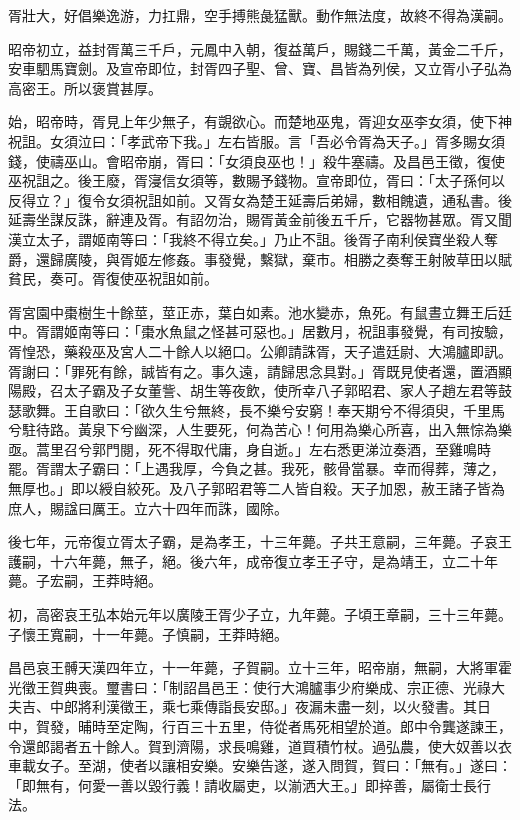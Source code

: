 \begin{pinyinscope}
胥壯大，好倡樂逸游，力扛鼎，空手搏熊彘猛獸。動作無法度，故終不得為漢嗣。

昭帝初立，益封胥萬三千戶，元鳳中入朝，復益萬戶，賜錢二千萬，黃金二千斤，安車駟馬寶劍。及宣帝即位，封胥四子聖、曾、寶、昌皆為列侯，又立胥小子弘為高密王。所以褒賞甚厚。

始，昭帝時，胥見上年少無子，有覬欲心。而楚地巫鬼，胥迎女巫李女須，使下神祝詛。女須泣曰：「孝武帝下我。」左右皆服。言「吾必令胥為天子。」胥多賜女須錢，使禱巫山。會昭帝崩，胥曰：「女須良巫也！」殺牛塞禱。及昌邑王徵，復使巫祝詛之。後王廢，胥寖信女須等，數賜予錢物。宣帝即位，胥曰：「太子孫何以反得立？」復令女須祝詛如前。又胥女為楚王延壽后弟婦，數相餽遺，通私書。後延壽坐謀反誅，辭連及胥。有詔勿治，賜胥黃金前後五千斤，它器物甚眾。胥又聞漢立太子，謂姬南等曰：「我終不得立矣。」乃止不詛。後胥子南利侯寶坐殺人奪爵，還歸廣陵，與胥姬左修姦。事發覺，繫獄，棄巿。相勝之奏奪王射陂草田以賦貧民，奏可。胥復使巫祝詛如前。

胥宮園中棗樹生十餘莖，莖正赤，葉白如素。池水變赤，魚死。有鼠晝立舞王后廷中。胥謂姬南等曰：「棗水魚鼠之怪甚可惡也。」居數月，祝詛事發覺，有司按驗，胥惶恐，藥殺巫及宮人二十餘人以絕口。公卿請誅胥，天子遣廷尉、大鴻臚即訊。胥謝曰：「罪死有餘，誠皆有之。事久遠，請歸思念具對。」胥既見使者還，置酒顯陽殿，召太子霸及子女董訾、胡生等夜飲，使所幸八子郭昭君、家人子趙左君等鼓瑟歌舞。王自歌曰：「欲久生兮無終，長不樂兮安窮！奉天期兮不得須臾，千里馬兮駐待路。黃泉下兮幽深，人生要死，何為苦心！何用為樂心所喜，出入無悰為樂亟。蒿里召兮郭門閱，死不得取代庸，身自逝。」左右悉更涕泣奏酒，至雞鳴時罷。胥謂太子霸曰：「上遇我厚，今負之甚。我死，骸骨當暴。幸而得葬，薄之，無厚也。」即以綬自絞死。及八子郭昭君等二人皆自殺。天子加恩，赦王諸子皆為庶人，賜諡曰厲王。立六十四年而誅，國除。

後七年，元帝復立胥太子霸，是為孝王，十三年薨。子共王意嗣，三年薨。子哀王護嗣，十六年薨，無子，絕。後六年，成帝復立孝王子守，是為靖王，立二十年薨。子宏嗣，王莽時絕。

初，高密哀王弘本始元年以廣陵王胥少子立，九年薨。子頃王章嗣，三十三年薨。子懷王寬嗣，十一年薨。子慎嗣，王莽時絕。

昌邑哀王髆天漢四年立，十一年薨，子賀嗣。立十三年，昭帝崩，無嗣，大將軍霍光徵王賀典喪。璽書曰：「制詔昌邑王：使行大鴻臚事少府樂成、宗正德、光祿大夫吉、中郎將利漢徵王，乘七乘傳詣長安邸。」夜漏未盡一刻，以火發書。其日中，賀發，晡時至定陶，行百三十五里，侍從者馬死相望於道。郎中令龔遂諫王，令還郎謁者五十餘人。賀到濟陽，求長鳴雞，道買積竹杖。過弘農，使大奴善以衣車載女子。至湖，使者以讓相安樂。安樂告遂，遂入問賀，賀曰：「無有。」遂曰：「即無有，何愛一善以毀行義！請收屬吏，以湔洒大王。」即捽善，屬衛士長行法。


\end{pinyinscope}
